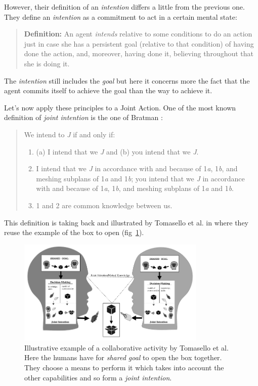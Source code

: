 \documentclass[english,a4paper,11pt,twoside]{StyleThese}
\begin{document}
However, their definition of an \textit{intention} differs a little from the previous one. They define an \textit{intention} as a commitment to act in a certain mental state:

\begin{quote}
\textbf{Definition:} An agent \textit{intends} relative to some conditions to do an action just in case she has a persistent goal (relative to that condition) of having done the action, and, moreover, having done it, believing throughout that she is doing it.
\end{quote}

The \textit{intention} still includes the \textit{goal} but here it concerns more the fact that the agent commits itself to achieve the goal than the way to achieve it.

Let's now apply these principles to a Joint Action. One of the most known definition of \textit{joint intention} is the one of Bratman \cite{bratman1993shared}:

\begin{quote}
We intend to \textit{J} if and only if:
\begin{enumerate}
\item (a) I intend that we \textit{J} and (b) you intend that we \textit{J}.
\item I intend that we \textit{J} in accordance with and because of 1\textit{a}, 1\textit{b}, and meshing subplans of 1\textit{a} and 1\textit{b}; you intend that we \textit{J} in accordance with and because of 1\textit{a}, 1\textit{b}, and meshing subplans of 1\textit{a} and 1\textit{b}.
\item 1 and 2 are common knowledge between us.
\end{enumerate}
\end{quote}

This definition is taking back and illustrated by Tomasello et al. in \cite{tomasello2005understanding} where they reuse the example of the box to open (fig~\ref{fig:intention_jointe}).

\begin{figure}[!h]
	\centering
    \includegraphics[width=0.8\textwidth]{figs/Chapter1/intention_jointe.png}
    \caption{Illustrative example of a collaborative activity by Tomasello et al. Here the humans have for \textit{shared goal} to open the box together. They choose a means to perform it which takes into account the other capabilities and so form a \textit{joint intention}.}
    \label{fig:intention_jointe}
\end{figure}
\end{document}
